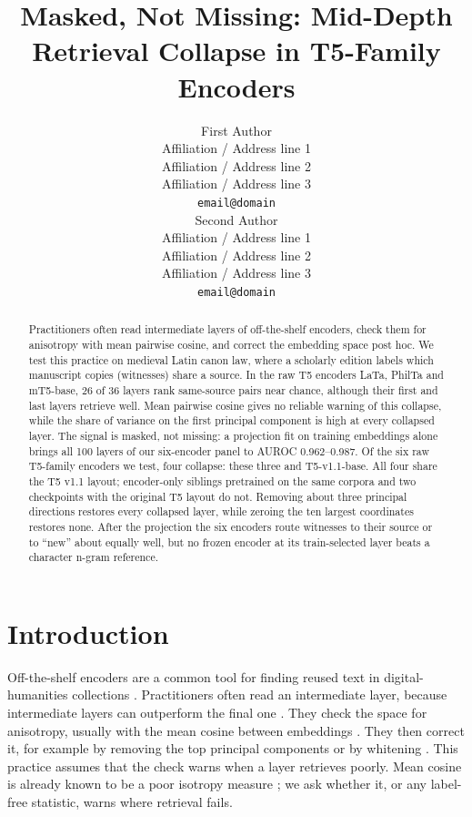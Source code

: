 \documentclass[11pt]{article}
\title{Masked, Not Missing: Mid-Depth Retrieval Collapse in T5-Family Encoders}
\author{First Author \\
  Affiliation / Address line 1 \\
  Affiliation / Address line 2 \\
  Affiliation / Address line 3 \\
  \texttt{email@domain} \\\And
  Second Author \\
  Affiliation / Address line 1 \\
  Affiliation / Address line 2 \\
  Affiliation / Address line 3 \\
  \texttt{email@domain} \\}
\begin{document}
\maketitle

\begin{abstract}
Practitioners often read intermediate layers of off-the-shelf encoders, check them for anisotropy with mean pairwise cosine, and correct the embedding space post hoc.
We test this practice on medieval Latin canon law, where a scholarly edition labels which manuscript copies (witnesses) share a source.
In the raw T5 encoders LaTa, PhilTa and mT5-base, 26 of 36 layers rank same-source pairs near chance, although their first and last layers retrieve well.
Mean pairwise cosine gives no reliable warning of this collapse, while the share of variance on the first principal component is high at every collapsed layer.
The signal is masked, not missing: a projection fit on training embeddings alone brings all 100 layers of our six-encoder panel to AUROC 0.962--0.987.
Of the six raw T5-family encoders we test, four collapse: these three and T5-v1.1-base.
All four share the T5 v1.1 layout; encoder-only siblings pretrained on the same corpora and two checkpoints with the original T5 layout do not.
Removing about three principal directions restores every collapsed layer, while zeroing the ten largest coordinates restores none.
After the projection the six encoders route witnesses to their source or to ``new'' about equally well, but no frozen encoder at its train-selected layer beats a character n-gram reference.
\end{abstract}

\section{Introduction}
\label{sec:intro}

Off-the-shelf encoders are a common tool for finding reused text in digital-humanities collections \citep[e.g.,][]{manjavacas2019allusive,schelb2026locisimiles}.
Practitioners often read an intermediate layer, because intermediate layers can outperform the final one \citep{skean2025layer}.
They check the space for anisotropy, usually with the mean cosine between embeddings \citep{ethayarajh2019contextual}.
They then correct it, for example by removing the top principal components \citep{mu2018allbutthetop} or by whitening \citep{su2021whitening}.
This practice assumes that the check warns when a layer retrieves poorly.
Mean cosine is already known to be a poor isotropy measure \citep{rudman2022isoscore}; we ask whether it, or any label-free statistic, warns where retrieval fails.
\end{document}

